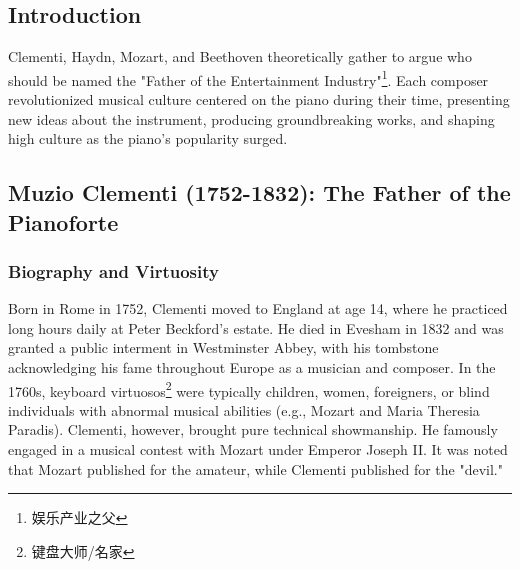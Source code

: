 \documentclass[math,code]{amznotes}
\theoremstyle{remark}
\begin{document}
\subsection{Introduction}
Clementi, Haydn, Mozart, and Beethoven theoretically gather to argue who should be named the "Father of the Entertainment Industry"\footnote{娱乐产业之父}. Each composer revolutionized musical culture centered on the piano during their time, presenting new ideas about the instrument, producing groundbreaking works, and shaping high culture as the piano's popularity surged.

\subsection{Muzio Clementi (1752-1832): The Father of the Pianoforte}
\subsubsection{Biography and Virtuosity}
Born in Rome in 1752, Clementi moved to England at age 14, where he practiced long hours daily at Peter Beckford's estate. He died in Evesham in 1832 and was granted a public interment in Westminster Abbey, with his tombstone acknowledging his fame throughout Europe as a musician and composer.
In the 1760s, keyboard virtuosos\footnote{键盘大师/名家} were typically children, women, foreigners, or blind individuals with abnormal musical abilities (e.g., Mozart and Maria Theresia Paradis). Clementi, however, brought pure technical showmanship. He famously engaged in a musical contest with Mozart under Emperor Joseph II. It was noted that Mozart published for the amateur, while Clementi published for the "devil."
\end{document}

